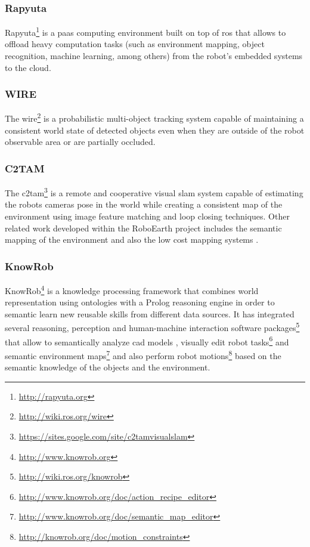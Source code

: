 \subsubsection{Rapyuta}

Rapyuta\footnote{\url{http://rapyuta.org}} \cite{Hunziker2013} is a \gls{paas} computing environment built on top of \gls{ros} that allows to offload heavy computation tasks (such as environment mapping, object recognition, machine learning, among others) from the robot's embedded systems to the cloud.


\subsubsection{WIRE}

The \gls{wire}\footnote{\url{http://wiki.ros.org/wire}} \cite{Elfring2013} is a probabilistic multi-object tracking system capable of maintaining a consistent world state of detected objects even when they are outside of the robot observable area or are partially occluded.


\subsubsection{C2TAM}

The \gls{c2tam}\footnote{\url{https://sites.google.com/site/c2tamvisualslam}} \cite{Riazuelo2014} is a remote and cooperative visual \gls{slam} system capable of estimating the robots cameras pose in the world while creating a consistent map of the environment using image feature matching and loop closing techniques. Other related work developed within the RoboEarth project includes the semantic mapping of the environment \cite{Riazuelo2015} and also the low cost mapping systems \cite{Mohanarajah2015}.


\subsubsection{KnowRob}

KnowRob\footnote{\url{http://www.knowrob.org}} \cite{Tenorth2013k} is a knowledge processing framework that combines world representation using ontologies with a Prolog reasoning engine in order to semantic learn new reusable skills from different data sources. It has integrated several reasoning, perception and human-machine interaction software packages\footnote{\url{http://wiki.ros.org/knowrob}} that allow to semantically analyze \gls{cad} models \cite{Tenorth2013cad}, visually edit robot tasks\footnote{\url{http://www.knowrob.org/doc/action_recipe_editor}} and semantic environment maps\footnote{\url{http://www.knowrob.org/doc/semantic_map_editor}} \cite{Pangercic2012} and also perform robot motions\footnote{\url{http://knowrob.org/doc/motion_constraints}} \cite{tenorth14motiontemplates} based on the semantic knowledge of the objects and the environment.


